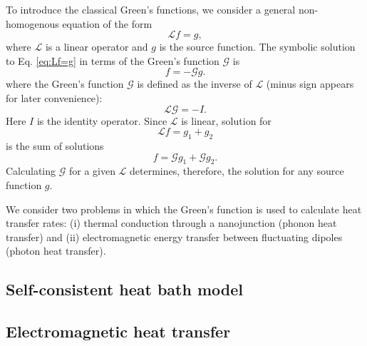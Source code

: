 To introduce the classical Green's functions, we consider a general non-homogenous equation of the form
 \begin{equation}
  \mathcal{L} f = g, \label{eq:Lf=g}
 \end{equation}
 where $\mathcal{L}$ is a linear operator and $g$ is the source function. The symbolic solution to Eq. \eqref{eq:Lf=g} in terms of the Green's function $\mathcal{G}$ is
 \begin{equation}
  f = -\mathcal{G} g.
 \end{equation}
where the Green's function $\mathcal{G}$ is defined as the inverse of $\mathcal{L}$ (minus sign appears for later convenience):
 \begin{equation}
  \mathcal{L} \mathcal{G} = -I.
 \end{equation}
 Here $I$ is the identity operator. Since $\mathcal{L}$ is linear, solution for 
 \begin{equation}
 \mathcal{L} f = g_1 + g_2
 \end{equation}
 is the sum of solutions
 \begin{equation}
  f = \mathcal{G}g_1 + \mathcal{G} g_2.
 \end{equation}
 Calculating $\mathcal{G}$ for a given $\mathcal{L}$ determines, therefore, the solution for any source function $g$. 

We consider two problems in which the Green's function is used to calculate heat transfer rates: (i) thermal conduction through a nanojunction (phonon heat transfer) and (ii) electromagnetic energy transfer between fluctuating dipoles (photon heat transfer).
\fi
\subsection{Self-consistent heat bath model}



\iffalse
To derive an algebraic expression for $\bb{u}_C$ in terms of the source terms, we first eliminate the time derivatives by performing temporal Fourier transform:
\begin{equation}
  -m\omega^2 \tilde{\bb{u}}_I = - \bb{K}_I \tilde{\bb{u}}_I - \sum_{J\neq I} \bb{V}_{IJ} \tilde{\bb{u}}_J +i m \gamma_I \omega \tilde{\bb{u}}_I + \tilde{\xi}_I.
\end{equation}
Solving for $\tilde{\bb{u}}_I$, we get
\begin{equation}
 \bb{u}_I(\omega) = \bb{g}_I(\omega) \left[ \sum_{J\neq I} \bb{V}_{IJ} \hat{\bb{u}}_J(\omega) \right]
\end{equation}
\fi



\subsection{Electromagnetic heat transfer}
